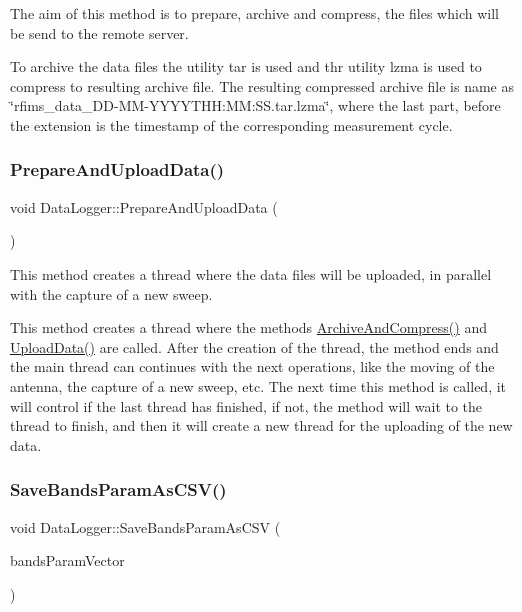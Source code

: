 The aim of this method is to prepare, archive and compress, the files which will be send to the remote server. 

To archive the data files the utility \textquotesingle{}tar\textquotesingle{} is used and thr utility \textquotesingle{}lzma\textquotesingle{} is used to compress to resulting archive file. The resulting compressed archive file is name as \char`\"{}rfims\+\_\+data\+\_\+\+D\+D-\/\+M\+M-\/\+Y\+Y\+Y\+Y\+T\+H\+H\+:\+M\+M\+:\+S\+S.\+tar.\+lzma\char`\"{}, where the last part, before the extension is the timestamp of the corresponding measurement cycle. \mbox{\label{classDataLogger_a98ea7aaa941bbddea8069415e1652759}} 
\subsubsection{\texorpdfstring{Prepare\+And\+Upload\+Data()}{PrepareAndUploadData()}}
{\footnotesize\ttfamily void Data\+Logger\+::\+Prepare\+And\+Upload\+Data (\begin{DoxyParamCaption}{ }\end{DoxyParamCaption})}



This method creates a thread where the data files will be uploaded, in parallel with the capture of a new sweep. 

This method creates a thread where the methods {\ttfamily \hyperlink{classDataLogger_a147fb7eaee1c38bbf57ef2d6cddf70d5}{Archive\+And\+Compress()}} and {\ttfamily \hyperlink{classDataLogger_ab58f4cc05f738ef757c884fe9ef131eb}{Upload\+Data()}} are called. After the creation of the thread, the method ends and the main thread can continues with the next operations, like the moving of the antenna, the capture of a new sweep, etc. The next time this method is called, it will control if the last thread has finished, if not, the method will wait to the thread to finish, and then it will create a new thread for the uploading of the new data. \mbox{\label{classDataLogger_a2ffe9fb45883c2880e1c45a4406fc22b}} 
\subsubsection{\texorpdfstring{Save\+Bands\+Param\+As\+C\+S\+V()}{SaveBandsParamAsCSV()}}
{\footnotesize\ttfamily void Data\+Logger\+::\+Save\+Bands\+Param\+As\+C\+SV (\begin{DoxyParamCaption}\item[{const std\+::vector$<$ \hyperlink{structBandParameters}{Band\+Parameters} $>$ \&}]{bands\+Param\+Vector }\end{DoxyParamCaption})}



